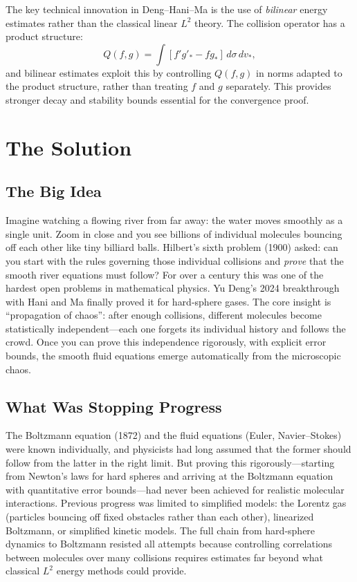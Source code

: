 The key technical innovation in Deng--Hani--Ma is the use of \emph{bilinear} energy estimates rather than the classical linear $L^2$ theory. The collision operator has a product structure:
\[
Q(f, g) = \int [f' g'_* - f g_*] \, d\sigma \, dv_*,
\]
and bilinear estimates exploit this by controlling $Q(f, g)$ in norms adapted to the product structure, rather than treating $f$ and $g$ separately. This provides stronger decay and stability bounds essential for the convergence proof.

\section{The Solution}

\subsection{The Big Idea}
Imagine watching a flowing river from far away: the water moves smoothly as a single unit. Zoom in close and you see billions of individual molecules bouncing off each other like tiny billiard balls. Hilbert's sixth problem (1900) asked: can you start with the rules governing those individual collisions and \emph{prove} that the smooth river equations must follow? For over a century this was one of the hardest open problems in mathematical physics. Yu Deng's 2024 breakthrough with Hani and Ma finally proved it for hard-sphere gases. The core insight is ``propagation of chaos'': after enough collisions, different molecules become statistically independent---each one forgets its individual history and follows the crowd. Once you can prove this independence rigorously, with explicit error bounds, the smooth fluid equations emerge automatically from the microscopic chaos.

\subsection{What Was Stopping Progress}
The Boltzmann equation (1872) and the fluid equations (Euler, Navier--Stokes) were known individually, and physicists had long assumed that the former should follow from the latter in the right limit. But proving this rigorously---starting from Newton's laws for hard spheres and arriving at the Boltzmann equation with quantitative error bounds---had never been achieved for realistic molecular interactions. Previous progress was limited to simplified models: the Lorentz gas (particles bouncing off fixed obstacles rather than each other), linearized Boltzmann, or simplified kinetic models. The full chain from hard-sphere dynamics to Boltzmann resisted all attempts because controlling correlations between molecules over many collisions requires estimates far beyond what classical $L^2$ energy methods could provide.

